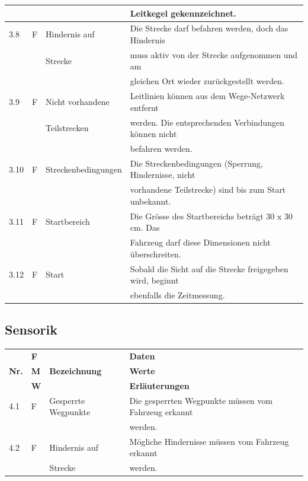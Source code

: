 \documentclass[11pt, a4paper]{article}
\begin{document}
\begin{tabular}{|l|l|l|l|}
    & & & Leitkegel gekennzeichnet. \\
    \hline
    3.8 & F & Hindernis auf & Die Strecke darf befahren werden, doch das Hindernis \\
    & & Strecke & muss aktiv von der Strecke aufgenommen und am \\
    & & & gleichen Ort wieder zurückgestellt werden. \\
    \hline
    3.9 & F & Nicht vorhandene & Leitlinien können aus dem Wege-Netzwerk entfernt \\
    & & Teilstrecken & werden. Die entsprechenden Verbindungen können nicht \\
    & & & befahren werden. \\
    \hline
    3.10 & F & Streckenbedingungen & Die Streckenbedingungen (Sperrung, Hindernisse, nicht \\
    & & & vorhandene Teilstrecke) sind bis zum Start unbekannt. \\
    \hline
    3.11 & F & Startbereich & Die Grösse des Startbereichs beträgt 30 x 30 cm. Das \\
    & & & Fahrzeug darf diese Dimensionen nicht überschreiten. \\
    \hline
    3.12 & F & Start & Sobald die Sicht auf die Strecke freigegeben wird, beginnt \\
    & & & ebenfalls die Zeitmessung. \\
    \hline
    \end{tabular}


\subsection{Sensorik}
    \begin{tabular}{|l|l|l|l|}
    \hline
    & \textbf{F} & & \textbf{Daten} \\
    \textbf{Nr.} & \textbf{M} & \textbf{Bezeichnung} & \textbf{Werte} \\
    & \textbf{W} & & \textbf{Erläuterungen} \\
    \hline
    4.1 & F &  Gesperrte Wegpunkte & Die gesperrten Wegpunkte müssen vom Fahrzeug erkannt \\
    & & & werden. \\
    \hline
    4.2 & F & Hindernis auf & Mögliche Hindernisse müssen vom Fahrzeug erkannt \\
    & & Strecke & werden. \\
    \hline
    \end{tabular}
\end{document}
